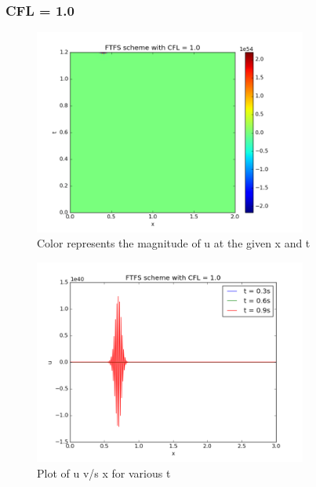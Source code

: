 \documentclass[11pt, a4paper]{article}
\begin{document}
\subsubsection{CFL = 1.0}
\begin{figure}[H]
 \centering
 \includegraphics[width = 0.8\textwidth]{FTFS2_1.png}
 \caption{Color represents the magnitude of u at the given x and t}
\end{figure}

\begin{figure}[H]
 \centering
 \includegraphics[width = 0.8\textwidth]{FTFS2_1_1.png}
 \caption{Plot of u v/s x for various t}
\end{figure}
\end{document}
